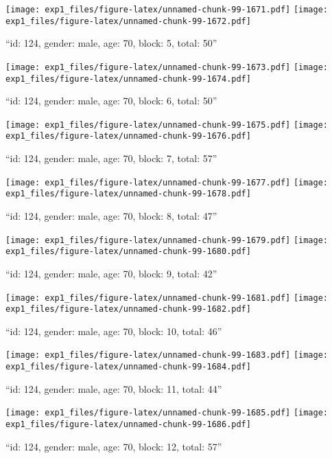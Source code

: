 \documentclass[,]{article}
\begin{document}
\texttt{[image: exp1\_files/figure-latex/unnamed-chunk-99-1671.pdf]}
\texttt{[image: exp1\_files/figure-latex/unnamed-chunk-99-1672.pdf]}

\newpage
[1] 

``id: 124, gender: male, age: 70, block: 5, total: 50''

\texttt{[image: exp1\_files/figure-latex/unnamed-chunk-99-1673.pdf]}
\texttt{[image: exp1\_files/figure-latex/unnamed-chunk-99-1674.pdf]}

\newpage
[1] 

``id: 124, gender: male, age: 70, block: 6, total: 50''

\texttt{[image: exp1\_files/figure-latex/unnamed-chunk-99-1675.pdf]}
\texttt{[image: exp1\_files/figure-latex/unnamed-chunk-99-1676.pdf]}

\newpage
[1] 

``id: 124, gender: male, age: 70, block: 7, total: 57''

\texttt{[image: exp1\_files/figure-latex/unnamed-chunk-99-1677.pdf]}
\texttt{[image: exp1\_files/figure-latex/unnamed-chunk-99-1678.pdf]}

\newpage
[1] 

``id: 124, gender: male, age: 70, block: 8, total: 47''

\texttt{[image: exp1\_files/figure-latex/unnamed-chunk-99-1679.pdf]}
\texttt{[image: exp1\_files/figure-latex/unnamed-chunk-99-1680.pdf]}

\newpage
[1] 

``id: 124, gender: male, age: 70, block: 9, total: 42''

\texttt{[image: exp1\_files/figure-latex/unnamed-chunk-99-1681.pdf]}
\texttt{[image: exp1\_files/figure-latex/unnamed-chunk-99-1682.pdf]}

\newpage
[1] 

``id: 124, gender: male, age: 70, block: 10, total: 46''

\texttt{[image: exp1\_files/figure-latex/unnamed-chunk-99-1683.pdf]}
\texttt{[image: exp1\_files/figure-latex/unnamed-chunk-99-1684.pdf]}

\newpage
[1] 

``id: 124, gender: male, age: 70, block: 11, total: 44''

\texttt{[image: exp1\_files/figure-latex/unnamed-chunk-99-1685.pdf]}
\texttt{[image: exp1\_files/figure-latex/unnamed-chunk-99-1686.pdf]}

\newpage
[1] 

``id: 124, gender: male, age: 70, block: 12, total: 57''
\end{document}
